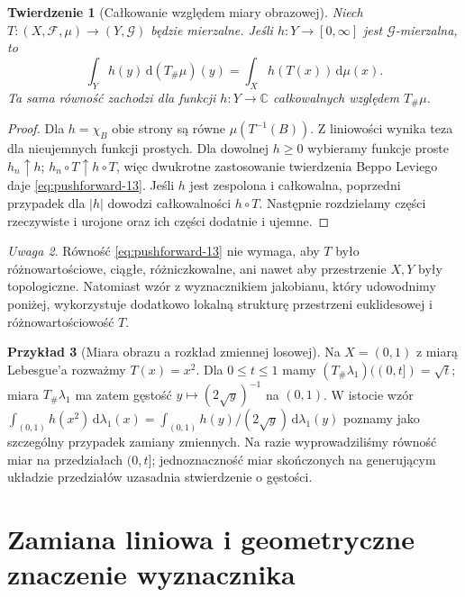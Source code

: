 \documentclass[11pt,a4paper,oneside]{book}
\numberwithin{equation}{chapter}
\theoremstyle{plain}
\newtheorem{twierdzenie}{Twierdzenie}[chapter]
\theoremstyle{definition}
\newtheorem{przyklad}[twierdzenie]{Przykład}
\theoremstyle{remark}
\newtheorem{uwaga}[twierdzenie]{Uwaga}
\begin{document}
\begin{twierdzenie}[Całkowanie względem miary obrazowej]
\label{thm:pushforward-integral-13}
Niech $T:(X,\mathcal F,\mu)\to(Y,\mathcal G)$ będzie mierzalne.
Jeśli $h:Y\to[0,\infty]$ jest $\mathcal G$-mierzalna, to
\begin{equation}\label{eq:pushforward-13}
\int_Y h(y)\,\mathrm d(T_\#\mu)(y)
=\int_X h(T(x))\,\mathrm d\mu(x).
\end{equation}
Ta sama równość zachodzi dla funkcji $h:Y\to\mathbb C$
całkowalnych względem $T_\#\mu$.
\end{twierdzenie}
\begin{proof}
Dla $h=\chi_B$ obie strony są równe $\mu(T^{-1}(B))$.
Z liniowości wynika teza dla nieujemnych funkcji prostych.
Dla dowolnej $h\ge0$ wybieramy funkcje proste $h_n\uparrow h$;
$h_n\circ T\uparrow h\circ T$, więc dwukrotne zastosowanie
twierdzenia Beppo Leviego daje \eqref{eq:pushforward-13}.
Jeśli $h$ jest zespolona i całkowalna, poprzedni przypadek dla
$|h|$ dowodzi całkowalności $h\circ T$. Następnie rozdzielamy
części rzeczywiste i urojone oraz ich części dodatnie i ujemne.
\end{proof}

\begin{uwaga}
Równość \eqref{eq:pushforward-13} nie wymaga, aby $T$ było
różnowartościowe, ciągłe, różniczkowalne, ani nawet aby przestrzenie
$X,Y$ były topologiczne. Natomiast wzór z wyznacznikiem jakobianu,
który udowodnimy poniżej, wykorzystuje dodatkowo lokalną strukturę
przestrzeni euklidesowej i różnowartościowość $T$.
\end{uwaga}

\begin{przyklad}[Miara obrazu a rozkład zmiennej losowej]
Na $X=(0,1)$ z miarą Lebesgue'a rozważmy $T(x)=x^2$.
Dla $0\le t\le1$ mamy
$(T_\#\lambda_1)((0,t])=\sqrt t$; miara $T_\#\lambda_1$
ma zatem gęstość $y\mapsto(2\sqrt y)^{-1}$ na $(0,1)$.
W istocie wzór
$\int_{(0,1)}h(x^2)\,\mathrm d\lambda_1(x)
=\int_{(0,1)}h(y)/(2\sqrt y)\,\mathrm d\lambda_1(y)$
poznamy jako szczególny przypadek zamiany zmiennych.
Na razie wyprowadziliśmy równość miar na przedziałach $(0,t]$;
jednoznaczność miar skończonych na generującym układzie przedziałów
uzasadnia stwierdzenie o gęstości.
\end{przyklad}

\section{Zamiana liniowa i geometryczne znaczenie wyznacznika}
\end{document}
